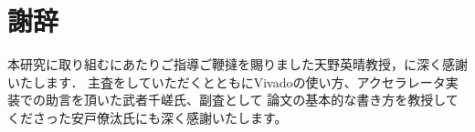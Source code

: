 \chapter{謝辞}
{
本研究に取り組むにあたりご指導ご鞭撻を賜りました天野英晴教授，に深く感謝いたします．
主査をしていただくとともにVivadoの使い方、アクセラレータ実装での助言を頂いた武者千嵯氏、副査として
論文の基本的な書き方を教授してくださった安戸僚汰氏にも深く感謝いたします。

}
